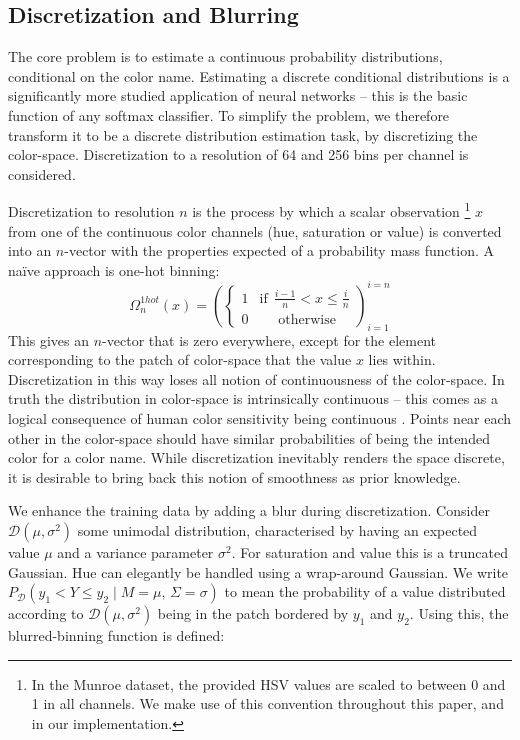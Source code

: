 \documentclass[11pt,a4paper]{article}
\newcommand{\parencite}{\citep}
\begin{document}
\subsection{Discretization and Blurring}\label{sec:discretization-and-blurring}
The core problem is to estimate a continuous  probability distributions, conditional on the color name.
Estimating a discrete conditional distributions is a significantly more studied application of neural networks
-- this is the basic function of any softmax classifier.
To simplify the problem, we therefore transform it to be a discrete distribution estimation task, by discretizing the color-space.
Discretization to a resolution of 64 and 256 bins per channel is considered.


Discretization to resolution $n$ is the process by which a scalar observation%
\footnote{In the Munroe dataset, the provided HSV values are scaled to between 0 and 1 in all channels. We make use of this convention throughout this paper, and in our implementation.}
 $x$
from one of the continuous color channels (hue, saturation or value) is converted into an $n$-vector with the properties expected of a probability mass function.
A na{\"i}ve approach is one-hot binning:
\[\Omega_{n}^{1hot}(x)=\left(\begin{cases}
1 & \mathrm{if}\:\:\frac{i-1}{n}<x\le\frac{i}{n}\\
0 & \:\:\:\:\:\:\mathrm{otherwise}
\end{cases}\right)_{i=1}^{i=n}
\]
This gives an $n$-vector that is zero everywhere, except for the element corresponding to the patch of color-space that the value $x$ lies within.
Discretization in this way loses all notion of continuousness of the color-space.
%
In truth the distribution in color-space is intrinsically continuous -- this comes as a logical consequence of human color sensitivity being continuous \parencite{STOCKMAN1999perception}.
Points near each other in the color-space should have similar probabilities of being the intended color for a color name.
While discretization inevitably renders the space discrete, it is desirable to bring back this notion of smoothness as prior knowledge.

We enhance the training data by adding a blur during discretization.
Consider $\mathcal{D}(\mu,\sigma^{2})$ some unimodal distribution, characterised by having an expected value $\mu$ and a variance parameter $\sigma^{2}$.
For saturation and value this is a truncated Gaussian.
Hue can elegantly be handled using a wrap-around Gaussian.
We write $P_{\mathcal{D}}(y_{1}{<}Y{\le} y_{2}\mid M{=}\mu,\,\Sigma=\sigma)$ to mean the probability of a value distributed according to $\mathcal{D}(\mu,\sigma^{2})$ being in the patch bordered by $y_1$ and $y_2$.
Using this, the blurred-binning function is defined: 
\end{document}
